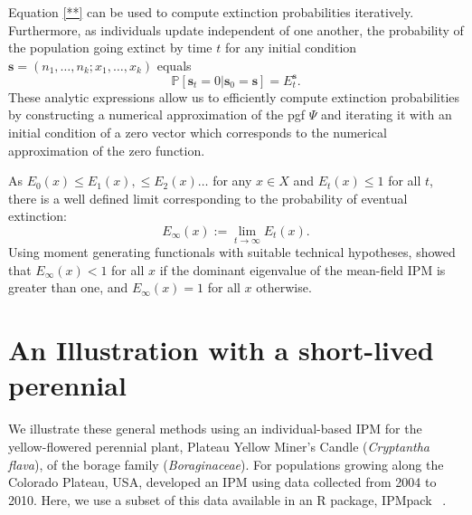 \documentclass[12pt]{amsart}\usepackage[]{graphicx}\usepackage[]{color}
\def\P{\mathbb P}
\def\s{\mathbf s}
\begin{document}
Equation \eqref{**} can be used to compute extinction probabilities iteratively. Furthermore, as individuals update independent of one another, the probability of the population going extinct by time $t$ for any initial condition $\s=(n_1,\dots,n_k;x_1,\dots,x_k)$ equals
\begin{equation}\label{starstar}
\P[\s_t=0|\s_0=\s]=E_t^\s.
\end{equation}
These analytic expressions allow us to efficiently compute extinction probabilities by constructing a numerical approximation of the pgf $\Psi$ and iterating it with an initial condition of a zero vector which corresponds to the numerical approximation of the zero function.

As $E_0(x)\le E_1(x),\le E_2(x)\dots$ for any $x\in X$ and $E_t(x)\le 1$ for all $t$, there is a well defined limit corresponding to the probability of eventual extinction:
\[
E_\infty(x):=\lim_{t\to\infty} E_t(x).
\]
Using moment generating functionals with suitable technical hypotheses, \citet{harris-63} showed that $E_\infty(x)<1$ for all $x$ if the dominant eigenvalue of the mean-field IPM is greater than one, and $E_\infty(x)=1$ for all $x$ otherwise.

\section*{An Illustration with a short-lived perennial}

We illustrate these general methods using an individual-based IPM for the yellow-flowered perennial plant, Plateau Yellow Miner's Candle (\emph{Cryptantha flava}), of the borage family (\emph{Boraginaceae}). For populations growing along the Colorado Plateau, USA, \citet{salguero-etal-12} developed an IPM using data collected from 2004 to 2010. Here, we use a subset of this data available in an R package, IPMpack ~\citep{IPMpack}.
\end{document}
